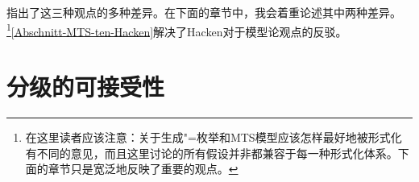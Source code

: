  \citet{PS2001a} 指出了这三种观点的多种差异。在下面的章节中，我会着重论述其中两种差异。 \footnote{%
	在这里读者应该注意：关于生成"=枚举和MTS模型应该怎样最好地被形式化有不同的意见，而且这里讨论的所有假设并非都兼容于每一种形式化体系。下面的章节只是宽泛地反映了重要的观点。%
}\ref{Abschnitt-MTS-ten-Hacken}解决了Hacken对于模型论观点的反驳。

\section{分级的可接受性}

